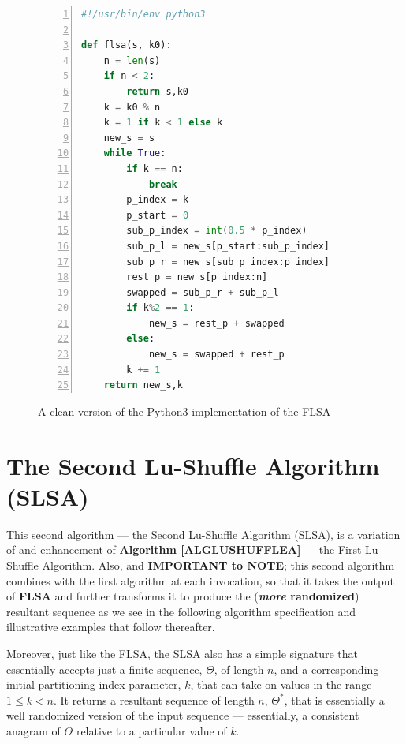 \documentclass[a4paper, 18pt]{book} %
\begin{document}
\begin{figure}[H]
  \begin{center}
  \begin{lstlisting}[caption={The FLSA}, label={LST_FLSA_clean}, language=Python, frame=single, numbers=left, basicstyle=\ttfamily,  commentstyle=\color{blue}, stringstyle=\color{orange}, keywordstyle=\color{purple}\bfseries]
#!/usr/bin/env python3

def flsa(s, k0):
    n = len(s)
    if n < 2:
        return s,k0
    k = k0 % n
    k = 1 if k < 1 else k
    new_s = s
    while True:
        if k == n:
            break
        p_index = k
        p_start = 0
        sub_p_index = int(0.5 * p_index)
        sub_p_l = new_s[p_start:sub_p_index]
        sub_p_r = new_s[sub_p_index:p_index]
        rest_p = new_s[p_index:n]
        swapped = sub_p_r + sub_p_l
        if k%2 == 1:
            new_s = rest_p + swapped
        else:
            new_s = swapped + rest_p
        k += 1
    return new_s,k
\end{lstlisting}
  \end{center}
  \caption{A clean version of the Python3 implementation of the FLSA}
\end{figure}


\section{The Second Lu-Shuffle Algorithm (SLSA)}
\label{APPSLSA}

This second algorithm --- the Second Lu-Shuffle Algorithm (SLSA), is a variation of and enhancement of \textbf{\hyperref[ALGLUSHUFFLEA]{Algorithm \ref{ALGLUSHUFFLEA}}} --- the First Lu-Shuffle Algorithm. Also, and \textbf{IMPORTANT to NOTE}; this second algorithm combines with the first algorithm at each invocation, so that it takes the output of \textbf{FLSA} and further transforms it to produce the (\textbf{\textit{more} randomized}) resultant  sequence as we see in the following algorithm specification and illustrative examples that follow thereafter.

Moreover, just like the FLSA, the SLSA also has a simple signature that essentially accepts just a finite sequence, $\Theta$, of length $n$, and a corresponding initial partitioning index parameter, $k$, that can take on values in the range $1 \leq k < n$. It returns a resultant sequence of length $n$, $\Theta^*$, that is essentially a well randomized version of the input sequence --- essentially, a consistent anagram of $\Theta$ relative to a particular value of $k$.
\end{document}
